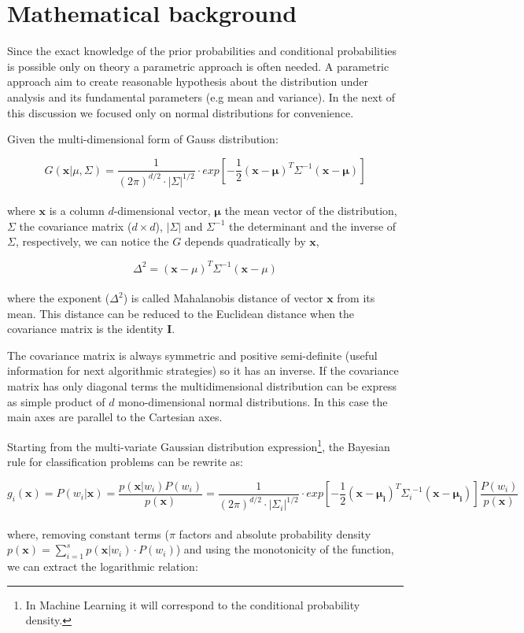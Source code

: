 \documentclass{standalone}
\begin{document}
\section*{Mathematical background}

Since the exact knowledge of the prior probabilities and conditional probabilities is possible only on theory a parametric approach is often needed.
A parametric approach aim to create reasonable hypothesis about the distribution under analysis and its fundamental parameters (e.g mean and variance).
In the next of this discussion we focused only on normal distributions for convenience.

Given the multi-dimensional form of Gauss distribution:

$$
G(\mathbf{x}|\mu, \Sigma) = \frac{1}{(2\pi)^{d/2}\cdot\left|\Sigma\right|^{1/2}}\cdot exp\left[-\frac{1}{2}(\mathbf{x}-\mathbf{\mu})^T\Sigma^{-1}(\mathbf{x}-\mathbf{\mu})\right]
$$
\\
where $\mathbf{x}$ is a column $d$-dimensional vector, $\mathbf{\mu}$ the mean vector of the distribution, $\Sigma$ the covariance matrix ($d\times d$), $|\Sigma|$ and $\Sigma^{-1}$ the determinant and the inverse of $\Sigma$, respectively, we can notice the $G$ depends quadratically by $\mathbf{x}$,

$$
\Delta^2 = (\mathbf{x}-\mu)^T\Sigma^{-1}(\mathbf{x}-\mu)
$$
\\
where the exponent ($\Delta^2$) is called Mahalanobis distance of vector $\mathbf{x}$ from its mean.
This distance can be reduced to the Euclidean distance when the covariance matrix is the identity $\mathbf{I}$.

The covariance matrix is always symmetric and positive semi-definite (useful information for next algorithmic strategies) so it has an inverse.
If the covariance matrix has only diagonal terms the multidimensional distribution can be express as simple product of $d$ mono-dimensional normal distributions.
In this case the main axes are parallel to the Cartesian axes.

Starting from the multi-variate Gaussian distribution expression\footnote{
  In Machine Learning it will correspond to the conditional probability density.
}, the Bayesian rule for classification problems can be rewrite as:

$$
g_i(\mathbf{x}) = P(w_i|\mathbf{x}) = \frac{p(\mathbf{x}|w_i)P(w_i)}{p(\mathbf{x})} = \frac{1}{(2\pi)^{d/2}\cdot\left|\Sigma_i\right|^{1/2}}\cdot exp\left[-\frac{1}{2}(\mathbf{x}-\mathbf{\mu_i})^T{\Sigma_i}^{-1}(\mathbf{x}-\mathbf{\mu_i})\right] \frac{P(w_i)}{p(\mathbf{x})}
$$
\\
where, removing constant terms ($\pi$ factors and absolute probability density $p(\mathbf{x}) = \sum_{i=1}^s p(\mathbf{x}|w_i)\cdot P(w_i)$) and using the monotonicity of the function, we can extract the logarithmic relation:
\end{document}

